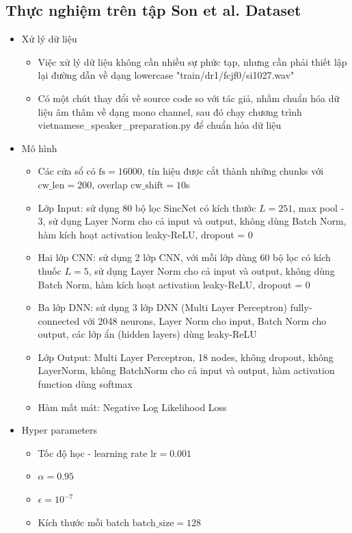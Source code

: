 \documentclass{article}
\begin{document}
	\subsection{Thực nghiệm trên tập Son et al. Dataset}
	\begin{itemize}
		\item Xử lý dữ liệu
		\begin{itemize}
			\item Việc xử lý dữ liệu không cần nhiều sự phức tạp, nhưng cần phải thiết lập lại đường dẫn về dạng lowercase "train/dr1/fcjf0/si1027.wav"
			\item Có một chút thay đổi về source code so với tác giả, nhầm chuẩn hóa dữ liệu âm thâm về dạng mono channel, sau đó chạy chương trình vietnamese\_speaker\_preparation.py để chuẩn hóa dữ liệu
		\end{itemize}
		\item Mô hình 
		\begin{itemize}
			\item Các cửa sổ có $\text{fs} = 16000$, tín hiệu được cắt thành những chunks với $\text{cw\_len}=200$, overlap $\text{cw\_shift}=10$s
			\item Lớp Input: sử dụng 80 bộ lọc SincNet có kích thước $L=251$, max pool - 3, sử dụng Layer Norm cho cả input và output, không dùng Batch Norm, hàm kích hoạt activation leaky-ReLU, dropout = 0
			\item Hai lớp CNN: sử dụng 2 lớp CNN, với mỗi lớp dùng 60 bộ lọc có kích thuốc $L=5$, sử dụng Layer Norm cho cả input và output, không dùng Batch Norm, hàm kích hoạt activation leaky-ReLU, dropout = 0
			\item Ba lớp DNN: sử dụng 3 lớp DNN (Multi Layer Perceptron) fully-connected với 2048 neurons, Layer Norm cho input, Batch Norm cho output, các lớp ẩn (hidden layers) dùng leaky-ReLU
			\item Lớp Output: Multi Layer Perceptron, 18 nodes, không dropout, không LayerNorm, không BatchNorm cho cả input và output, hàm activation function dùng softmax
			\item Hàm mất mát: Negative Log Likelihood Loss
		\end{itemize}
		\item Hyper parameters
		\begin{itemize}
			\item Tốc độ học - learning rate $\text{lr} = 0.001$
			\item $\alpha = 0.95$
			\item $\epsilon = 10^{-7}$
			\item Kích thước mỗi batch $\text{batch\_size}=128$

\end{itemize}
\end{itemize}
\end{document}
